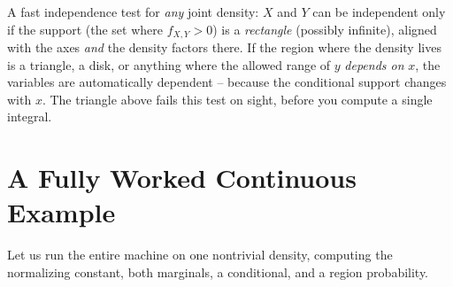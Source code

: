 \begin{trapbox}
A fast independence test for \emph{any} joint density: $X$ and $Y$ can be
independent only if the support (the set where $f_{X,Y}>0$) is a \emph{rectangle}
(possibly infinite), aligned with the axes \emph{and} the density factors there.
If the region where the density lives is a triangle, a disk, or anything where the
allowed range of $y$ \emph{depends on} $x$, the variables are automatically
dependent -- because the conditional support changes with $x$. The triangle above
fails this test on sight, before you compute a single integral.
\end{trapbox}

\section{A Fully Worked Continuous Example}
\label{ch13:worked-continuous}

Let us run the entire machine on one nontrivial density, computing the
normalizing constant, both marginals, a conditional, and a region probability.

